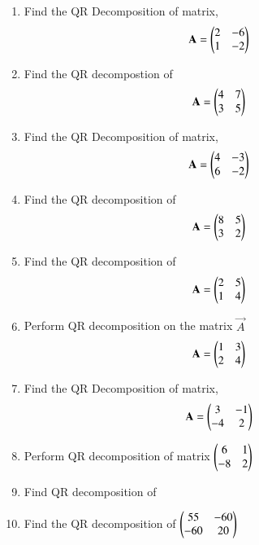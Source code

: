 \begin{enumerate}[label=\thesubsection.\arabic*.,ref=\thesubsection.\theenumi]
\solution

\item Find the QR Decomposition of matrix,
\begin{align}
\mathbf{A} = \begin{pmatrix}2&-6\\1&-2\end{pmatrix}
\label{eq:solutions/2/26/Q}
\end{align}
\solution

%
\item Find the QR decompostion of 
\begin{align} 
    \mathbf{A} = \begin{pmatrix}4 & 7 \\ 3 & 5\end{pmatrix}
\end{align}
%
\solution

\item Find the QR Decomposition of matrix,
\begin{align}
\mathbf{A} = \begin{pmatrix}4&-3\\6&-2\end{pmatrix}
\label{eq:solutions/2/28/Q}
\end{align}
%
\solution

\item Find the QR decomposition of 
\begin{align}
\mathbf{A}=\begin{pmatrix}8&5\\3&2\end{pmatrix} \label{eq:solutions/2/29/eq:1}
\end{align}
%
%
\item Find the QR decomposition of 
\begin{align}
\mathbf{A}=\begin{pmatrix}2&5\\1&4\end{pmatrix} \label{eq:solutions/2/30/1}
\end{align}

\solution

%
\item Perform QR decomposition on the matrix $\vec{A}$ 
\begin{align}
\mathbf{A}=\begin{pmatrix}1&3\\2&4\end{pmatrix} \label{eq:solutions/2/31/eq:1}
\end{align}
%
\solution

%
\item Find the QR Decomposition of matrix,
\begin{align}
\mathbf{A} = \begin{pmatrix}3&-1\\-4&2\end{pmatrix}
\label{eq:solutions/2/32/eq:p0}
\end{align}
%
\solution

\item Perform QR decomposition of matrix $\begin{pmatrix}6&1\\-8&2\end{pmatrix}$
\solution

\item Find QR decomposition of 
%
\solution

%
\item Find the QR decomposition of $\begin{pmatrix}55 & -60\\-60 & 20\end{pmatrix}$

\solution

\end{enumerate}

